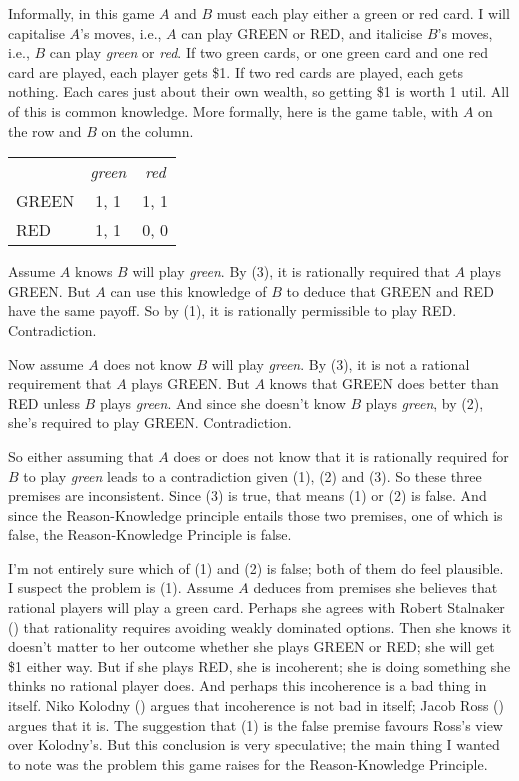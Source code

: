 \documentclass[
  10pt,
  letterpaper,
  DIV=11,
  numbers=noendperiod,
  twoside]{scrartcl}
\begin{document}
Informally, in this game \(A\) and \(B\) must each play either a green
or red card. I will capitalise \(A\)'s moves, i.e., \(A\) can play GREEN
or RED, and italicise \(B\)'s moves, i.e., \(B\) can play \emph{green}
or \emph{red}. If two green cards, or one green card and one red card
are played, each player gets \$1. If two red cards are played, each gets
nothing. Each cares just about their own wealth, so getting \$1 is worth
1 util. All of this is common knowledge. More formally, here is the game
table, with \(A\) on the row and \(B\) on the column.

\begin{longtable}[]{@{}lcc@{}}
\toprule\noalign{}
\endhead
\bottomrule\noalign{}
\endlastfoot
& \emph{green} & \emph{red} \\
GREEN & 1, 1 & 1, 1 \\
RED & 1, 1 & 0, 0 \\
\end{longtable}

Assume \(A\) knows \(B\) will play \emph{green}. By (3), it is
rationally required that \(A\) plays GREEN. But \(A\) can use this
knowledge of \(B\) to deduce that GREEN and RED have the same payoff. So
by (1), it is rationally permissible to play RED. Contradiction.

Now assume \(A\) does not know \(B\) will play \emph{green}. By (3), it
is not a rational requirement that \(A\) plays GREEN. But \(A\) knows
that GREEN does better than RED unless \(B\) plays \emph{green}. And
since she doesn't know \(B\) plays \emph{green}, by (2), she's required
to play GREEN. Contradiction.

So either assuming that \(A\) does or does not know that it is
rationally required for \(B\) to play \emph{green} leads to a
contradiction given (1), (2) and (3). So these three premises are
inconsistent. Since (3) is true, that means (1) or (2) is false. And
since the Reason-Knowledge principle entails those two premises, one of
which is false, the Reason-Knowledge Principle is false.

I'm not entirely sure which of (1) and (2) is false; both of them do
feel plausible. I suspect the problem is (1). Assume \(A\) deduces from
premises she believes that rational players will play a green card.
Perhaps she agrees with Robert Stalnaker
() that rationality requires avoiding
weakly dominated options. Then she knows it doesn't matter to her
outcome whether she plays GREEN or RED; she will get \$1 either way. But
if she plays RED, she is incoherent; she is doing something she thinks
no rational player does. And perhaps this incoherence is a bad thing in
itself. Niko Kolodny () argues that
incoherence is not bad in itself; Jacob Ross
() argues that it is. The suggestion that
(1) is the false premise favours Ross's view over Kolodny's. But this
conclusion is very speculative; the main thing I wanted to note was the
problem this game raises for the Reason-Knowledge Principle.
\end{document}
